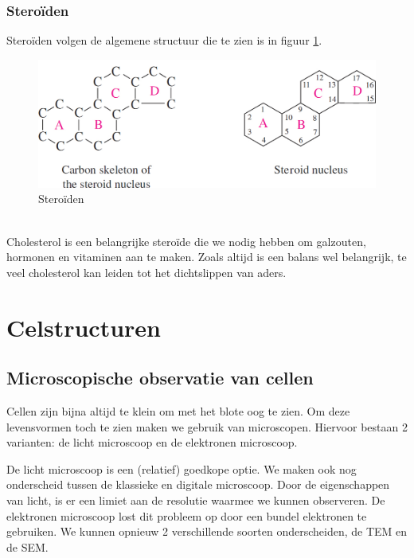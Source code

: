 \documentclass[a4paper,kul]{kulakarticle} %
\begin{document}
\subsubsection{Steroïden}
Steroïden volgen de algemene structuur die te zien is in figuur \ref{fig:steroidenstructuur}. 
\begin{figure}[h]
	\centering
	\includegraphics[width=0.5\linewidth]{steroidenstructuur}
	\caption[steroïden]{Steroïden}
	\label{fig:steroidenstructuur}
\end{figure}\\
Cholesterol is een belangrijke steroïde die we nodig hebben om galzouten, hormonen en vitaminen aan te maken. Zoals altijd is een balans wel belangrijk, te veel cholesterol kan leiden tot het dichtslippen van aders. 

\section{Celstructuren}
\subsection{Microscopische observatie van cellen}
Cellen zijn bijna altijd te klein om met het blote oog te zien. Om deze levensvormen toch te zien maken we gebruik van microscopen. Hiervoor bestaan 2 varianten: de licht microscoop en de elektronen microscoop. 

De licht microscoop is een (relatief) goedkope optie. We maken ook nog onderscheid tussen de klassieke en digitale microscoop. Door de eigenschappen van licht, is er een limiet aan de resolutie waarmee we kunnen observeren. De elektronen microscoop lost dit probleem op door een bundel elektronen te gebruiken. We kunnen opnieuw 2 verschillende soorten onderscheiden, de TEM en de SEM. 
\end{document}
